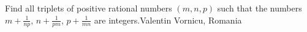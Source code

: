 Find all triplets of positive rational numbers $(m,n,p)$ such that the numbers $m+\frac 1{np}$,  $n+\frac 1{pm}$,  $p+\frac 1{mn}$ are integers.Valentin Vornicu, Romania